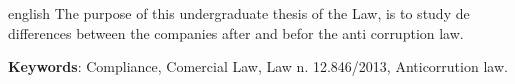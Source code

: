 \setlength{\absparsep}{18pt} %
\begin{resumo}[Abstract]
 \begin{otherlanguage*}{english}
The purpose of this undergraduate thesis of the Law, is to study de differences between the companies after and befor the anti corruption law. 

   \vspace{\onelineskip}
 
   \noindent 
   \textbf{Keywords}: Compliance, Comercial Law, Law n. 12.846/2013, Anticorrution law.
 \end{otherlanguage*}
\end{resumo}
